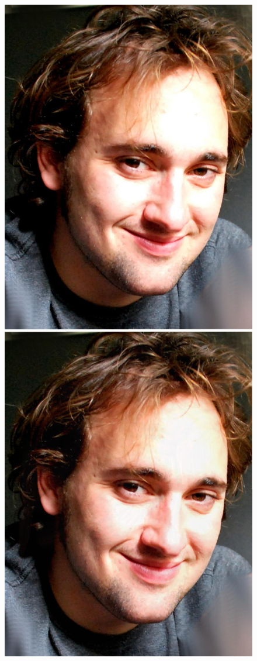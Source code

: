 \documentclass[11pt]{article}
\begin{document}
\begin{figure}[H]
\begin{center}
\includegraphics[scale=0.08]{figs/zombie/zombie_bf_01.jpg} 
\includegraphics[scale=0.08]{figs/zombie/zombie_bf_02.jpg} 

\end{center}
\end{figure}
\end{document}
